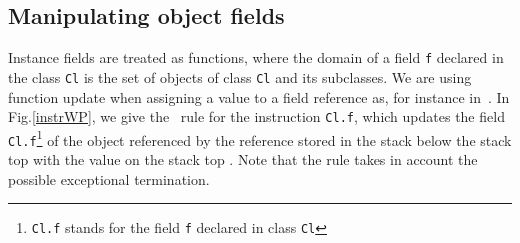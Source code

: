 \subsection{Manipulating object fields}
Instance fields are treated as functions, where the domain of a field \texttt{f} 
declared in the class \texttt{Cl} is the set of objects of class \texttt{Cl} and its subclasses.
We are using function update when assigning a value to a field reference as, for instance in~\cite{B00ppp}. In Fig.\ref{instrWP}, we give the \wpi \ rule for the
instruction  \texttt{Cl.f}, which updates the field \texttt{Cl.f}\footnote{ \texttt{Cl.f} stands for the field \texttt{f} declared in class 
\texttt{Cl}} of the object referenced by the reference stored in the stack below the stack top  with the value on the stack top \stack{\counter}.
 Note that the rule takes in account the possible exceptional termination.





